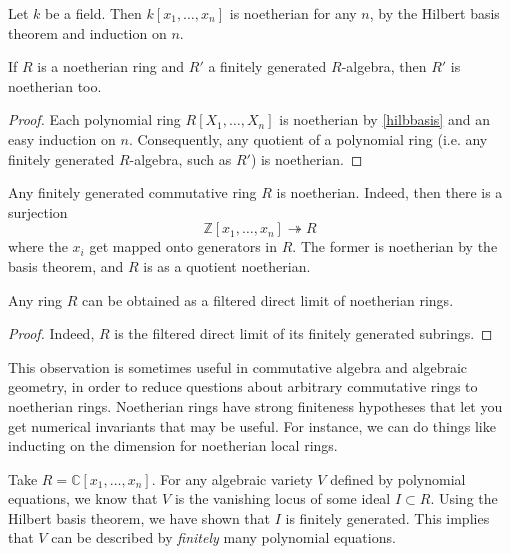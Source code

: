 \begin{example} 
Let $k$ be a field. Then $k[x_1, \dots, x_n]$ is noetherian for any $n$, by the
Hilbert basis theorem and induction on $n$. 
\end{example} 


\begin{corollary}  \label{hilbbasiscor}
If $R$ is a noetherian ring and $R'$ a finitely generated $R$-algebra, then
$R'$ is noetherian too. 
\end{corollary} 
\begin{proof} 
Each polynomial ring $R[X_1, \dots, X_n]$ is noetherian by \cref{hilbbasis} and an easy
induction on $n$. Consequently, any quotient of a polynomial ring (i.e. any
finitely generated $R$-algebra, such as $R'$) is noetherian.
\end{proof} 

\begin{example} 
Any finitely generated commutative ring $R$ is noetherian. Indeed, then there
is a surjection
\[ \mathbb{Z}[x_1, \dots, x_n] \twoheadrightarrow R  \]
where the $x_i$ get mapped onto generators in $R$. The former is noetherian by
the basis theorem, and $R$ is as a quotient noetherian. 
\end{example} 


\begin{corollary} 
Any ring $R$ can be obtained as a filtered direct limit of noetherian rings.
\end{corollary} 
\begin{proof} 
Indeed, $R$ is the filtered direct limit of its finitely generated subrings. 
\end{proof} 

This observation is sometimes useful in commutative algebra and algebraic
geometry, in order to reduce questions about arbitrary commutative rings to
noetherian rings. Noetherian rings have strong finiteness hypotheses that let
you get numerical invariants that may be useful. For instance, we can do things
like inducting on the dimension for noetherian local rings.

\begin{example} 
Take $R = \mathbb{C}[x_1, \dots, x_n]$. For any algebraic variety $V$ defined
by polynomial equations, we know that $V$ is  the vanishing locus of some ideal
$I \subset R$. Using the Hilbert basis theorem, we have shown that $I$ is
finitely generated. This implies that $V$ can be described by \emph{finitely}
many polynomial equations. 
\end{example} 

